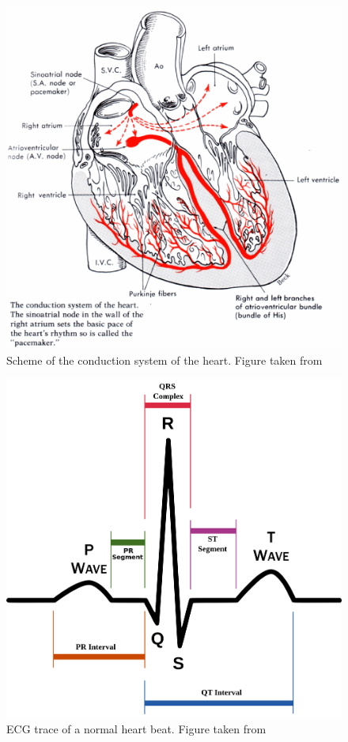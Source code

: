 \documentclass[type=dr, dr=rernat, accentcolor=tud7b,colorbacktitle, bigchapter, openright, twoside, 12pt ]{tudthesis}
\begin{document}
\vspace{-7cm}
\begin{figure}[H]
\begin{center}
\includegraphics[scale=0.3]{conduction_system.png}
\caption{Scheme of the conduction system of the heart. Figure taken from \cite{amc}}
\label{condsys}
\end{center}
\end{figure}

\begin{figure}[H]
\begin{center}
\includegraphics[scale=0.13]{ecg.png}
\caption{ECG trace of a normal heart beat. Figure taken from \cite{afib}}
\label{ecg}
\end{center}
\end{figure}
\end{document}
